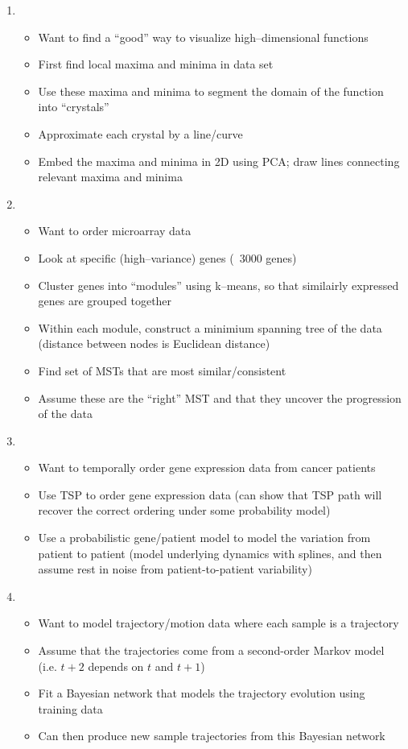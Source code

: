 \documentclass[12pt]{article}
\begin{document}
\begin{enumerate}
\item {}
\begin{itemize}
	\item Want to find a ``good'' way to visualize high--dimensional functions
	\item First find local maxima and minima in data set
	\item Use these maxima and minima to segment the domain of the function into ``crystals''
	\item Approximate each crystal by a line/curve
	\item Embed the maxima and minima in 2D using PCA; draw lines connecting relevant maxima and minima
\end{itemize}

\item {}
\begin{itemize}
	\item Want to order microarray data
	\item Look at specific (high--variance) genes (~3000 genes)
	\item Cluster genes into ``modules'' using k--means, so that similairly expressed genes are grouped together
	\item Within each module, construct a minimium spanning tree of the data (distance between nodes is Euclidean distance)
	\item Find set of MSTs that are most similar/consistent
	\item Assume these are the ``right'' MST and that they uncover the progression of the data
\end{itemize}

\item {}
\begin{itemize}
	\item Want to temporally order gene expression data from cancer patients
	\item Use TSP to order gene expression data (can show that TSP path will recover the correct ordering under some probability model)
	\item Use a probabilistic gene/patient model to model the variation from patient to patient (model underlying dynamics with splines, and then assume rest in noise from patient-to-patient variability)
\end{itemize}

\item {}
\begin{itemize}
	\item Want to model trajectory/motion data where each sample is a trajectory
	\item Assume that the trajectories come from a second-order Markov model (i.e. $t+2$ depends on $t$ and $t+1$)
	\item Fit a Bayesian network that models the trajectory evolution using training data
	\item Can then produce new sample trajectories from this Bayesian network
\end{itemize}


\end{enumerate}
\end{document}
